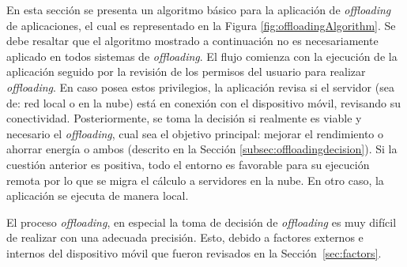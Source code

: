 En esta sección se presenta un algoritmo básico para la aplicación de \emph{offloading} de aplicaciones, el cual es representado 
en la Figura \ref{fig:offloadingAlgorithm}. Se debe resaltar que el algoritmo mostrado a continuación no es necesariamente  aplicado
en todos sistemas de \emph{offloading}.
El flujo comienza con la ejecución de la aplicación seguido por la revisión de los permisos del usuario para realizar \emph{offloading}. En caso posea estos privilegios, la aplicación revisa  si el servidor (sea 
de: red local o en la nube) está en conexión con el dispositivo móvil, revisando su conectividad. Posteriormente, se toma la decisión si realmente es viable y necesario el \emph{offloading}, cual sea el objetivo
principal: mejorar el rendimiento o ahorrar energía o ambos (descrito en la Sección
\ref{subsec:offloadingdecision}). Si la cuestión anterior es positiva, todo el entorno es favorable para su ejecución remota por lo que se migra el cálculo a servidores en la nube. En otro caso, la aplicación se ejecuta de manera local. 

El proceso \emph{offloading}, en especial la toma de decisión de \emph{offloading} es muy difícil de realizar con una adecuada precisión. 
Esto, debido a factores externos e internos del dispositivo móvil que fueron revisados en la Sección~\ref{sec:factors}.



